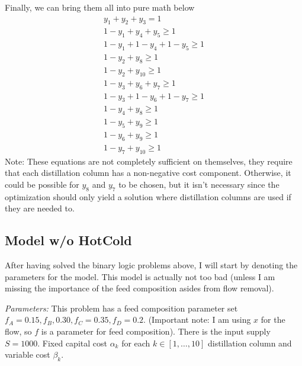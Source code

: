 \documentclass[11pt]{article}
\begin{document}
Finally, we can bring them all into pure math below
\begin{align*}
  y_1 + y_2 + y_3 = 1 \\
  1-y_1 + y_4 + y_5 \geq 1 \\
  1-y_1 + 1-y_4 + 1-y_5 \geq 1 \\
  1-y_2 + y_8 \geq 1 \\
  1-y_2 + y_{10} \geq 1 \\
  1-y_3 + y_6 + y_7 \geq 1 \\
  1-y_3 + 1 - y_6 + 1- y_7 \geq 1 \\
  1-y_4 + y_8 \geq 1 \\
  1-y_5+ y_9 \geq 1 \\
  1-y_6 + y_9 \geq 1 \\
  1-y_7 + y_{10} \geq 1
\end{align*}
Note: These equations are not completely sufficient on themselves, they require that each distillation column has a non-negative cost component.
Otherwise, it could be possible for $y_8$ and $y_7$ to be chosen, but it isn't necessary since the optimization should only yield a solution where distillation columns are used if they are needed to.
\subsection{Model w/o HotCold}
After having solved the binary logic problems above, I will start by denoting the parameters for the model.
This model is actually not too bad (unless I am missing the importance of the feed composition asides from flow removal).

\textit{Parameters:}
This problem has a feed composition parameter set $f_A=0.15,f_B,0.30,f_C=0.35,f_D=0.2$. 
(Important note: I am using $x$ for the flow, so $f$ is a parameter for feed composition).
There is the input supply $S=1000$.
Fixed capital cost $\alpha_k$ for each $k \in [1,\dots,10]$ distillation column and variable cost $\beta_k$.
\end{document}
